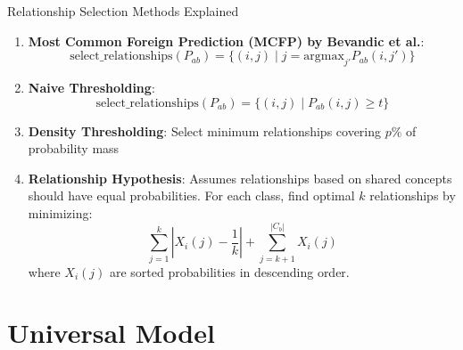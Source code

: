 \documentclass[aspectratio=169]{beamer}
\begin{document}
\begin{frame}{Relationship Selection Methods Explained}
    \begin{enumerate}
        \item \textbf{Most Common Foreign Prediction (MCFP) by Bevandic et al.}:
              \begin{equation}
                  \text{select\_relationships}(P_{ab}) = \{(i, j) \mid j = \text{argmax}_{j'} P_{ab}(i, j')\}
              \end{equation}

        \item \textbf{Naive Thresholding}:
              \begin{equation}
                  \text{select\_relationships}(P_{ab}) = \{(i, j) \mid P_{ab}(i, j) \geq t\}
              \end{equation}

        \item \textbf{Density Thresholding}: Select minimum relationships covering $p\%$ of probability mass

        \item \textbf{Relationship Hypothesis}: Assumes relationships based on shared concepts should have equal probabilities. For each class, find optimal $k$ relationships by minimizing:
              \begin{equation}
                  \sum_{j=1}^k \left| X_i(j) - \frac{1}{k} \right| + \sum_{j=k+1}^{|C_b|} X_i(j)
              \end{equation}
              where $X_i(j)$ are sorted probabilities in descending order.
    \end{enumerate}
\end{frame}


\section{Universal Model}
\end{document}
